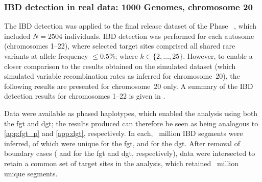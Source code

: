 %





%
\subsubsection{IBD detection in real data: 1000 Genomes, chromosome 20}
%

The IBD detection  was applied to the final release dataset of the  Phase~ \citep{GenomesProjectConsortium:2012co,Auton:2015gk}, which included ${N=\num{2504}}$ individuals.
IBD detection was performed for each autosome (chromosomes 1--22), where selected target sites comprised all shared rare variants at allele frequency ${\leq 0.5\%}$; \ie \fk{} where ${k \in \{2, \ldots, 25\}}$.
However, to enable a closer comparison to the results obtained on the simulated dataset (which simulated variable recombination rates as inferred for chromosome~20), the following results are presented for chromosome~20 only.
A summary of the IBD detection results for chromosomes 1--22 is given in .

%

%

Data were available as phased haplotypes, which enabled the analysis using both the \gls{fgt} and \gls{dgt}; \ie the results produced can therefore be seen as being analogous to \cref{app:fgt_p} and \cref{app:dgt}, respectively.
In each, ~million IBD segments were inferred, of which  were unique for the \gls{fgt}, and  for the \gls{dgt}.
After removal of boundary cases ( and  for the \gls{fgt} and \gls{dgt}, respectively), data were intersected to retain a common set of target sites in the analysis, which retained ~million unique segments.


